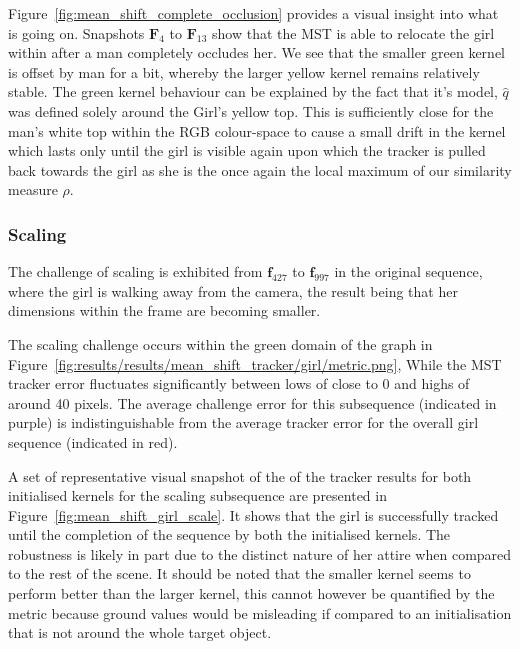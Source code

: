 Figure~\ref{fig:mean_shift_complete_occlusion} provides a visual insight into
what is going on. Snapshots $\mathbf{F}_4$ to $\mathbf{F}_{13}$ show that the
MST is able to relocate the girl within after a man completely occludes her. We
see that the smaller green kernel is offset by man for a bit, whereby the larger
yellow kernel remains relatively stable. The green kernel behaviour can be
explained by the fact that it's model, $\hat{q}$ was defined solely around the
Girl's yellow top. This is sufficiently close for the man's white top within the
RGB colour-space to cause a small drift in the kernel which lasts only until the
girl is visible again upon which the tracker is pulled back towards the girl as
she is the once again the local maximum of our similarity measure $\rho$.

\subsubsection{Scaling}
The challenge of scaling is exhibited from $\mathbf{f}_{427}$ to
$\mathbf{f}_{997}$ in the original sequence, where the girl is walking away from
the camera, the result being that her dimensions within the frame are becoming
smaller.

The scaling challenge occurs within the green domain of the graph in
Figure~\ref{fig:results/results/mean_shift_tracker/girl/metric.png}, 
While the MST tracker error fluctuates significantly between lows of close to 0
and highs of around 40 pixels. The average challenge error for this subsequence
(indicated in purple) is indistinguishable from the average tracker error for the overall girl
sequence (indicated in red).

A set of representative visual snapshot of the of the tracker results for both initialised kernels
for the scaling subsequence are presented in
Figure~\ref{fig:mean_shift_girl_scale}. It shows that the girl is successfully
tracked until the completion of the sequence by both the initialised kernels.
The robustness is likely in part due to the distinct nature of her attire when
compared to the rest of the scene. It should be noted that the smaller kernel
seems to perform better than the larger kernel, this cannot however be
quantified by the metric because ground values would be misleading if compared
to an initialisation that is not around the whole target object.

